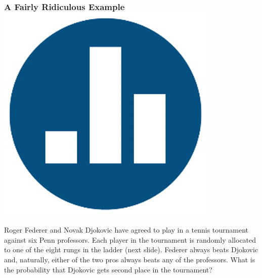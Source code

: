 \documentclass[handout]{beamer}
\begin{document}
\begin{frame}
\frametitle{A Fairly Ridiculous Example \hfill \includegraphics[scale = 0.05]{./images/clicker}}

Roger Federer and Novak Djokovic have agreed to play in a tennis tournament against six Penn professors. Each player in the tournament is randomly allocated to one of the eight rungs in the ladder (next slide). Federer always beats Djokovic and, naturally, either of the two pros always beats any of the professors. What is the probability that Djokovic gets second place in the tournament? 



\end{frame}
\end{document}
